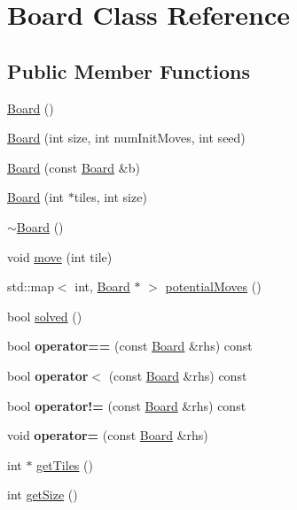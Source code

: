 \hypertarget{classBoard}{\section{\-Board \-Class \-Reference}
\label{classBoard}
}
\subsection*{\-Public \-Member \-Functions}
\begin{DoxyCompactItemize}
\item 
\hyperlink{classBoard_a9ee491d4fea680cf69b033374a9fdfcb}{\-Board} ()
\item 
\hyperlink{classBoard_a434d72861e7cee4ddbff4975d4522ff0}{\-Board} (int size, int num\-Init\-Moves, int seed)
\item 
\hyperlink{classBoard_ac77f209904bb37545295c17649a9dc17}{\-Board} (const \hyperlink{classBoard}{\-Board} \&b)
\item 
\hyperlink{classBoard_a97919e1594a034a83d6b18a6dd1c8b47}{\-Board} (int $\ast$tiles, int size)
\item 
\hyperlink{classBoard_af73f45730119a1fd8f6670f53f959e68}{$\sim$\-Board} ()
\item 
void \hyperlink{classBoard_aef09885273fef4c3fa3d80284936e873}{move} (int tile)
\item 
std\-::map$<$ int, \hyperlink{classBoard}{\-Board} $\ast$ $>$ \hyperlink{classBoard_a69149b8091bfaf02a394bedb9ff5f57f}{potential\-Moves} ()
\item 
bool \hyperlink{classBoard_aa2170b9bd685aae34f2c285add6da859}{solved} ()
\item 
\hypertarget{classBoard_acfdb9fa0c980de10be68aa082f31bda5}{bool {\bfseries operator==} (const \hyperlink{classBoard}{\-Board} \&rhs) const }\label{classBoard_acfdb9fa0c980de10be68aa082f31bda5}

\item 
\hypertarget{classBoard_a162027718b714192d52f8d3aa71359c3}{bool {\bfseries operator$<$} (const \hyperlink{classBoard}{\-Board} \&rhs) const }\label{classBoard_a162027718b714192d52f8d3aa71359c3}

\item 
\hypertarget{classBoard_a2724182ffc7179d2eee30d55baa64923}{bool {\bfseries operator!=} (const \hyperlink{classBoard}{\-Board} \&rhs) const }\label{classBoard_a2724182ffc7179d2eee30d55baa64923}

\item 
\hypertarget{classBoard_ad764a298abc603b9346a91e0cf857bcc}{void {\bfseries operator=} (const \hyperlink{classBoard}{\-Board} \&rhs)}\label{classBoard_ad764a298abc603b9346a91e0cf857bcc}

\item 
int $\ast$ \hyperlink{classBoard_a233cff437806895ee615dc67e3736780}{get\-Tiles} ()
\item 
int \hyperlink{classBoard_af093d8ac43989ad95dc03c714335b8e5}{get\-Size} ()
\end{DoxyCompactItemize}
